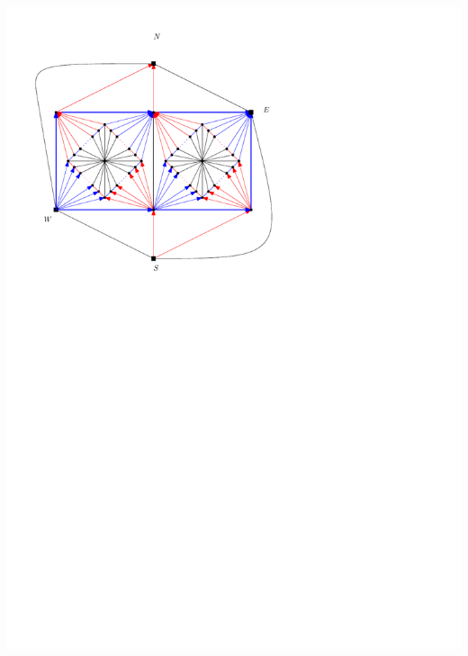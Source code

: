 \documentclass[a4paper]{article}
\begin{document}
\includegraphics[width=\textwidth]{fixExtension/img/manymany3}
\clearpage%
\end{document}
